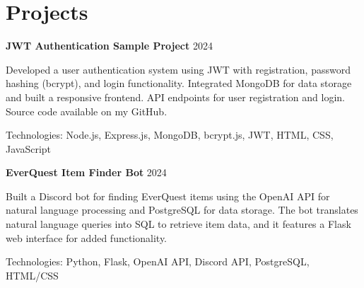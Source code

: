 \section*{Projects}
\resumeSubHeadingListStart

\item
\textbf{JWT Authentication Sample Project} \hfill 2024
\resumeItemListStart
\setlength\itemsep{-0.5em}  %
\item Developed a user authentication system using JWT with registration, password hashing (bcrypt), and login functionality. Integrated MongoDB for data storage and built a responsive frontend. API endpoints for user registration and login. Source code available on my GitHub.
\item Technologies: Node.js, Express.js, MongoDB, bcrypt.js, JWT, HTML, CSS, JavaScript
\resumeItemListEnd

\item
\textbf{EverQuest Item Finder Bot} \hfill 2024
\resumeItemListStart
\setlength\itemsep{-0.5em}  %
\item Built a Discord bot for finding EverQuest items using the OpenAI API for natural language processing and PostgreSQL for data storage. The bot translates natural language queries into SQL to retrieve item data, and it features a Flask web interface for added functionality.
\item Technologies: Python, Flask, OpenAI API, Discord API, PostgreSQL, HTML/CSS
\resumeItemListEnd

\resumeSubHeadingListEnd